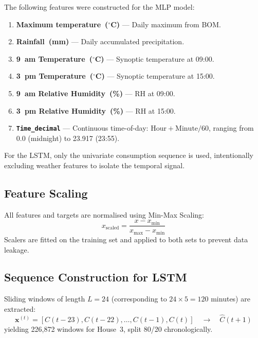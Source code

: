 \documentclass[12pt,a4paper]{article}
\begin{document}
The following features were constructed for the MLP model:

\begin{enumerate}[leftmargin=2em]
  \item \textbf{Maximum temperature~($^\circ$C)} --- Daily maximum from BOM.
  \item \textbf{Rainfall~(mm)} --- Daily accumulated precipitation.
  \item \textbf{9~am Temperature~($^\circ$C)} --- Synoptic temperature at 09:00.
  \item \textbf{3~pm Temperature~($^\circ$C)} --- Synoptic temperature at 15:00.
  \item \textbf{9~am Relative Humidity~(\%)} --- RH at 09:00.
  \item \textbf{3~pm Relative Humidity~(\%)} --- RH at 15:00.
  \item \textbf{\texttt{Time\_decimal}} --- Continuous time-of-day:
        $\text{Hour} + \text{Minute}/60$, ranging from 0.0 (midnight) to
        23.917 (23:55).
\end{enumerate}

For the LSTM, only the univariate consumption sequence is used, intentionally
excluding weather features to isolate the temporal signal.

\subsection{Feature Scaling}

All features and targets are normalised using Min-Max Scaling:
\begin{equation}
  x_{\text{scaled}} = \frac{x - x_{\min}}{x_{\max} - x_{\min}}
  \label{eq:minmax}
\end{equation}
Scalers are fitted on the training set and applied to both sets to prevent
data leakage.

\subsection{Sequence Construction for LSTM}

Sliding windows of length $L = 24$ (corresponding to $24 \times 5 = 120$
minutes) are extracted:
\begin{equation}
  \mathbf{x}^{(t)} = \left[C(t-23), C(t-22), \ldots, C(t-1), C(t)\right]
  \quad \longrightarrow \quad \hat{C}(t+1)
  \label{eq:window}
\end{equation}
yielding 226,872 windows for House~3, split 80/20 chronologically.
\end{document}

